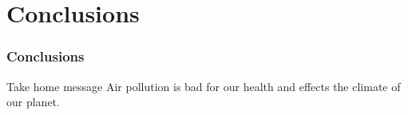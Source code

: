 \documentclass[xcolor=svgnames]{beamer}
\begin{document}

\section{Conclusions}

\begin{frame}
	
	\frametitle{Conclusions}
	
	\begin{alertblock}{Take home message}
		Air pollution is bad for our health and effects the climate of our planet.
	\end{alertblock}

	
\end{frame}
\end{document}
